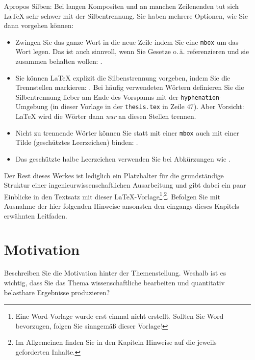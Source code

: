 Apropos Silben: Bei langen Kompositen und an manchen Zeilenenden tut sich \LaTeX{} sehr schwer mit der Silbentrennung. Sie haben mehrere Optionen, wie Sie dann vorgehen können:
\begin{itemize}
    \item{Zwingen Sie das ganze Wort in die neue Zeile indem Sie eine \texttt{mbox} um das Wort legen. Das ist auch sinnvoll, wenn Sie Gesetze o.\,ä. referenzieren und sie zusammen behalten wollen: .}
    \item{Sie können \LaTeX{} explizit die Silbenstrennung vorgeben, indem Sie die Trennstellen markieren: . Bei häufig verwendeten Wörtern definieren Sie die Silbentrennung lieber am Ende des Vorspanns mit der \texttt{hyphenation}-Umgebung (in dieser Vorlage in der \texttt{thesis.tex} in Zeile $47$). Aber Vorsicht: \LaTeX{} wird die Wörter dann \emph{nur} an diesen Stellen trennen.}
    \item{Nicht zu trennende Wörter können Sie statt mit einer \texttt{mbox} auch mit einer Tilde (geschütztes Leerzeichen) binden: .}
    \item{Das geschützte halbe Leerzeichen verwenden Sie bei Abkürzungen wie .}
\end{itemize}

Der Rest dieses Werkes ist lediglich ein Platzhalter für die grundständige Struktur einer ingenieurwissenschaftlichen Ausarbeitung und gibt dabei ein paar Einblicke in den Textsatz mit dieser \LaTeX{}-Vorlage\footnote{Eine Word-Vorlage wurde erst einmal nicht erstellt. Sollten Sie Word bevorzugen, folgen Sie sinngemäß dieser Vorlage!}\textsuperscript{,}\footnote{Im Allgemeinen finden Sie in den Kapiteln Hinweise auf die jeweils geforderten Inhalte.}. Befolgen Sie mit Ausnahme der hier folgenden Hinweise ansonsten den eingangs dieses Kapitels erwähnten  Leitfaden.



\section{Motivation}\label{sec:Intro:Motivation}
Beschreiben Sie die Motivation hinter der Themenstellung. Weshalb ist es wichtig, dass Sie das Thema wissenschaftliche bearbeiten und quantitativ belastbare Ergebnisse produzieren?


